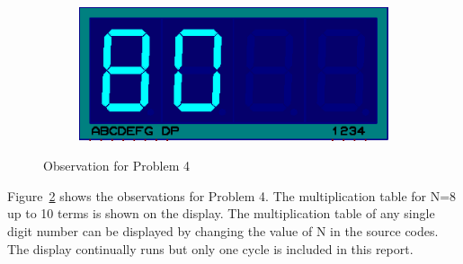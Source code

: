 \documentclass{lab_sheet}
\begin{document}
\begin{figure}[H]
\begin{subfigure}{.33\textwidth}
              \end{subfigure}
              \newline
              \hspace*{\fill}
              \begin{subfigure}{.33\textwidth}
                \centering
                \includegraphics[frame,width=.9\linewidth]{../Figures/m80}   
                \caption{}
                \label{fig:prob4-j}
              \end{subfigure}
              \hspace*{\fill}
            \caption{Observation for Problem 4}
            \label{fig:prob4}
            \end{figure}
            Figure~\ref{fig:prob4} shows the observations for Problem 4. The multiplication table for N=8 up to 10 terms is shown on the display. The multiplication table of any single digit number can be displayed by changing the value of N in the source codes. The display continually runs but only one cycle is included in this report.
\end{document}
